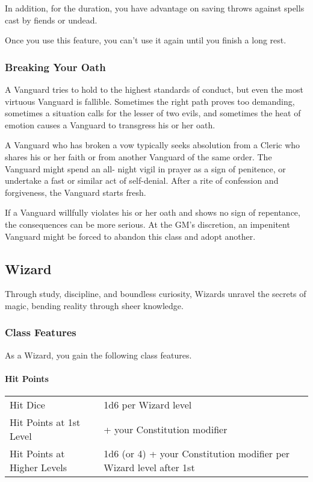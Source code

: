 In addition, for the duration, you have advantage on saving throws
against spells cast by fiends or undead.

Once you use this feature, you can't use it again until you finish a
long rest.

\subsubsection{Breaking Your Oath}\label{_breaking_your_oath}

A Vanguard tries to hold to the highest standards of conduct, but even
the most virtuous Vanguard is fallible. Sometimes the right path proves
too demanding, sometimes a situation calls for the lesser of two evils,
and sometimes the heat of emotion causes a Vanguard to transgress his or
her oath.

A Vanguard who has broken a vow typically seeks absolution from a Cleric
who shares his or her faith or from another Vanguard of the same order.
The Vanguard might spend an all- night vigil in prayer as a sign of
penitence, or undertake a fast or similar act of self-denial. After a
rite of confession and forgiveness, the Vanguard starts fresh.

If a Vanguard willfully violates his or her oath and shows no sign of
repentance, the consequences can be more serious. At the GM's
discretion, an impenitent Vanguard might be forced to abandon this class
and adopt another.

\subsection{Wizard}\label{_wizard}

Through study, discipline, and boundless curiosity, Wizards unravel the
secrets of magic, bending reality through sheer knowledge.

\subsubsection{Class Features}\label{_class_features_3}

As a Wizard, you gain the following class features.

\paragraph{Hit Points}\label{_hit_points_3}

\begin{longtable}[]{@{}
  >{\raggedright\arraybackslash}p{}
  >{\raggedright\arraybackslash}p{}@{}}
\toprule\noalign{}
\endhead
\bottomrule\noalign{}
\endlastfoot
Hit Dice & 1d6 per Wizard level \\
Hit Points at 1st Level & 6 + your Constitution modifier \\
Hit Points at Higher Levels & 1d6 (or 4) + your Constitution modifier
per Wizard level after 1st \\
\end{longtable}

